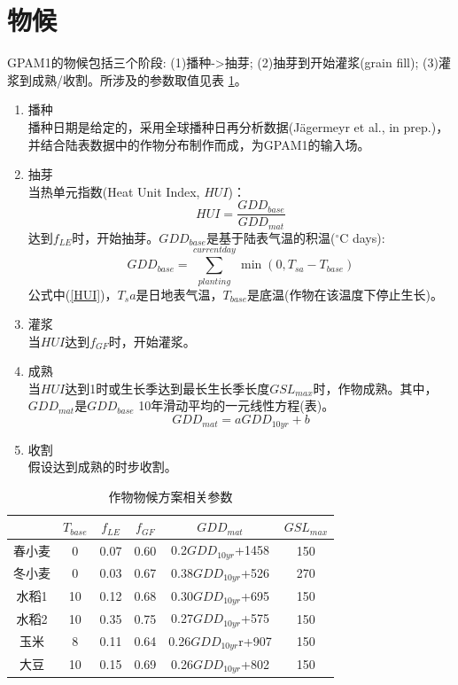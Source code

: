 \section{物候}
GPAM1的物候包括三个阶段: (1)播种->抽芽; (2)抽芽到开始灌浆(grain fill); (3)灌浆到成熟/收割。所涉及的参数取值见表 \ref{tab:作物物候方案相关参数}。\\
\begin{enumerate}
  \item 播种\\
  播种日期是给定的，采用全球播种日再分析数据(Jägermeyr et al., in prep.)，并结合陆表数据中的作物分布制作而成，为GPAM1的输入场。
  \item 抽芽\\
  当热单元指数(Heat Unit Index, $HUI$)：
  \begin{equation}\label{HUI}
  HUI=\frac{GDD_{base}}{GDD_{mat}}
  \end{equation}
  达到$f_{LE}$时，开始抽芽。$GDD_{base}$是基于陆表气温的积温($^{\circ}$C days):
  \begin{equation}
  GDD_{ {base }}=\sum_{planting}^{currentday} \min \left(0, T_{sa}-T_{base}\right)
  \end{equation}
  公式中(\ref{HUI})，$T_sa$是日地表气温，$T_{base}$是底温(作物在该温度下停止生长)。\\
  \item 灌浆\\
  当$HUI$达到$f_{GF}$时，开始灌浆。
  \item 成熟\\
  当$HUI$达到1时或生长季达到最长生长季长度$GSL_{max}$时，作物成熟。其中，$GDD_{mat}$是$GDD_{base}$ 
  10年滑动平均的一元线性方程(表\label{tab:作物物候方案相关参数})。
  \begin{equation}
    GDD_{mat}=a GDD_{10yr}+b
  \end{equation}
  \item 收割\\
  假设达到成熟的时步收割。
\end{enumerate}
\begin{table}[]
  \centering
  \caption{作物物候方案相关参数}
  \label{tab:作物物候方案相关参数}
\begin{tabular}{@{}cccccc@{}}
\toprule
    & $T_{base}$ & $f_{LE}$  & $f_{GF}$  & $GDD_{mat}$          & $GSL_{max}$ \\ \midrule
春小麦 & 0     & 0.07 & 0.60 & 0.2$GDD_{10yr}$+1458 & 150    \\
冬小麦 & 0     & 0.03 & 0.67 & 0.38$GDD_{10yr}$+526 & 270    \\
水稻1 & 10    & 0.12 & 0.68 & 0.30$GDD_{10yr}$+695 & 150    \\
水稻2 & 10    & 0.35 & 0.75 & 0.27$GDD_{10yr}$+575 & 150    \\
玉米  & 8     & 0.11 & 0.64 & 0.26$GDD_{10yr}$r+907 & 150    \\
大豆  & 10    & 0.15 & 0.69 & 0.26$GDD_{10yr}$+802 & 150    \\ \bottomrule
\end{tabular}
\end{table}

